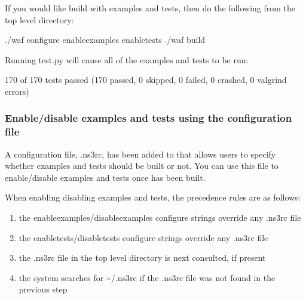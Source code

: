 \documentclass[letterpaper,10pt,english]{sphinxmanual}
\begin{document}
If you would like build  with examples and tests, then do the following from the top level  directory:

\begin{sphinxVerbatim}[commandchars=\\\{\}]
\PYGZdl{} ./waf configure \PYGZhy{}\PYGZhy{}enable\PYGZhy{}examples \PYGZhy{}\PYGZhy{}enable\PYGZhy{}tests
\PYGZdl{} ./waf build
\end{sphinxVerbatim}

Running test.py will cause all of the examples and tests to be run:

\begin{sphinxVerbatim}[commandchars=\\\{\}]
170 of 170 tests passed (170 passed, 0 skipped, 0 failed, 0 crashed, 0 valgrind errors)
\end{sphinxVerbatim}


\subsubsection{Enable/disable examples and tests using the  configuration file}
\label{\detokenize{enable-tests:enable-disable-examples-and-tests-using-the-ns3-configuration-file}}
A configuration file, .ns3rc, has been added to  that allows users to specify whether examples and tests should be built or not.  You can use this file to enable/disable examples and tests once  has been built.

When enabling disabling examples and tests, the precedence rules are as follows:
\begin{enumerate}
%
\item {} 
the \textendash{}enable\sphinxhyphen{}examples/\textendash{}disable\sphinxhyphen{}examples configure strings override any .ns3rc file

\item {} 
the \textendash{}enable\sphinxhyphen{}tests/\textendash{}disable\sphinxhyphen{}tests configure strings override any .ns3rc file

\item {} 
the .ns3rc file in the top level  directory is next consulted, if present

\item {} 
the system searches for \textasciitilde{}/.ns3rc if the .ns3rc file was not found in the previous step

\end{enumerate}
\end{document}
